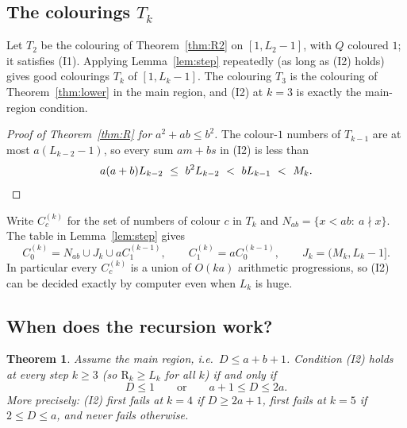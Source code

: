 \documentclass[11pt,a4paper]{article}
\newtheorem{theorem}{Theorem}[section]
\theoremstyle{definition}
\theoremstyle{remark}
\newcommand{\R}{\mathrm{R}}
\begin{document}
\subsection{The colourings \texorpdfstring{$T_k$}{T\_k}}
Let $T_2$ be the colouring of Theorem~\ref{thm:R2} on $[1,L_2-1]$, with $Q$ coloured $1$; it satisfies (I1). Applying Lemma~\ref{lem:step} repeatedly (as long as (I2) holds) gives good colourings $T_k$ of $[1,L_k-1]$. The colouring $T_3$ is the colouring of Theorem~\ref{thm:lower} in the main region, and (I2) at $k=3$ is exactly the main-region condition.

\begin{proof}[Proof of Theorem~\ref{thm:R} for $a^2+ab\le b^2$]
The colour-$1$ numbers of $T_{k-1}$ are at most $a(L_{k-2}-1)$, so every sum $am+bs$ in (I2) is less than
\[
  a(a+b)L_{k-2}\ \le\ b^2L_{k-2}\ <\ bL_{k-1}\ <\ M_k. \qedhere
\]
\end{proof}

Write $C_c^{(k)}$ for the set of numbers of colour $c$ in $T_k$ and $N_{ab}=\{x<ab:\ a\nmid x\}$. The table in Lemma~\ref{lem:step} gives
\begin{equation}\label{eq:recsets}
  C_0^{(k)}=N_{ab}\cup J_k\cup aC_1^{(k-1)},\qquad C_1^{(k)}=aC_0^{(k-1)},\qquad J_k=(M_k,L_k-1].
\end{equation}
In particular every $C_c^{(k)}$ is a union of $O(ka)$ arithmetic progressions, so (I2) can be decided exactly by computer even when $L_k$ is huge.

\subsection{When does the recursion work?}
\begin{theorem}\label{thm:D}
Assume the main region, i.e.\ $D\le a+b+1$. Condition (I2) holds at every step $k\ge3$ (so $\R_k\ge L_k$ for all $k$) if and only if
\[
  D\le1\qquad\text{or}\qquad a+1\le D\le2a .
\]
More precisely: (I2) first fails at $k=4$ if $D\ge2a+1$, first fails at $k=5$ if $2\le D\le a$, and never fails otherwise.
\end{theorem}
\end{document}
